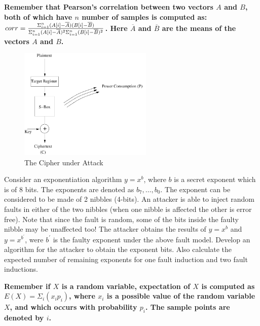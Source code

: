 \documentclass{article}
\begin{document}
\begin{questions}
\begin{enumerate}
{\bf Remember that Pearson's correlation between two vectors $A$ and $B$, both of which have $n$ number of samples is computed as: 
$corr={{\Sigma_{i=1}^n(A[i]-\overline{A})(B[i]-\overline{B})}\over
{\Sigma_{i=1}^n(A[i]-\overline{A})^2\Sigma_{i=1}^n(B[i]-\overline{B})^2}}$. 
Here $\overline{A}$ and $\overline{B}$ are the means of the vectors $A$ and $B$.} 
\end{enumerate}


\begin{figure}[h]
\centering
\includegraphics[width=2.5in]{figs/SBOXDPA}
\caption{The Cipher under Attack}
\label{sbox}
\end{figure}

\question Consider an exponentiation algorithm $y = x^b$, where $b$ is a secret exponent which is of 8 bits. The exponents are denoted as $b_7, \ldots, b_0$. The exponent can be considered to be made of 2 nibbles (4-bits). An attacker is able to inject random faults in either of the two nibbles (when one nibble is affected the other is error free). Note that since the fault is random, some of the bits inside the faulty nibble may be unaffected too! The attacker obtains the results of $y = x^b$ and $y = x^{b^{\prime}}$, were $b^{\prime}$ is the faulty exponent under the above fault model. Develop an algorithm for the attacker to obtain the exponent bits. Also calculate the expected number of remaining exponents for one fault induction and two fault inductions.

{\bf Remember if $X$ is a random variable, expectation of $X$ is computed as $E(X)=\Sigma_i (x_ip_i)$, where $x_i$ is a possible value of the random variable $X$, and which occurs with probability $p_i$. The sample points are denoted by $i$.} 


  


\end{questions}
\end{document}
